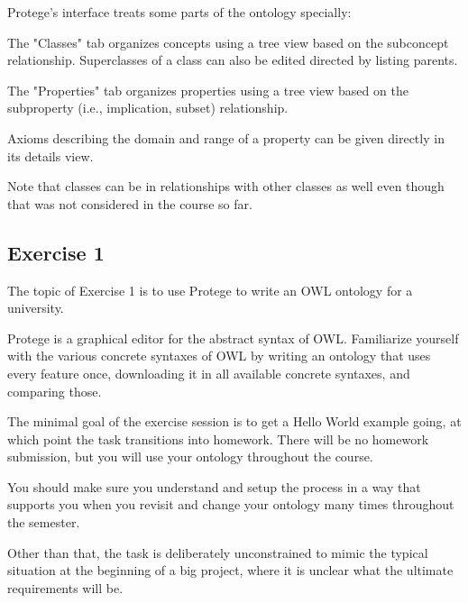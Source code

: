 Protege's interface treats some parts of the ontology specially:
\begin{compactitem}
 \item The "Classes" tab organizes concepts using a tree view based on the subconcept relationship.
 Superclasses of a class can also be edited directed by listing parents.
 \item The "Properties" tab organizes properties using a tree view based on the subproperty (i.e., implication, subset) relationship.
 \item Axioms describing the domain and range of a property can be given directly in its details view.
\end{compactitem}

Note that classes can be in relationships with other classes as well even though that was not considered in the course so far.

\subsection{Exercise 1}

The topic of Exercise 1 is to use Protege to write an OWL ontology for a university.

Protege is a graphical editor for the abstract syntax of OWL.
Familiarize yourself with the various concrete syntaxes of OWL by writing an ontology that uses every feature once, downloading it in all available concrete syntaxes, and comparing those.

The minimal goal of the exercise session is to get a Hello World example going, at which point the task transitions into homework.
There will be no homework submission, but you will use your ontology throughout the course.

You should make sure you understand and setup the process in a way that supports you when you revisit and change your ontology many times throughout the semester.

Other than that, the task is deliberately unconstrained to mimic the typical situation at the beginning of a big project, where it is unclear what the ultimate requirements will be.